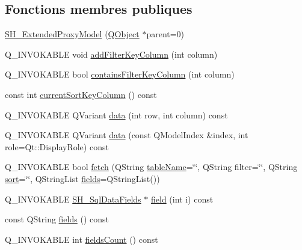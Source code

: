 \subsection*{Fonctions membres publiques}
\begin{DoxyCompactItemize}
\item 
\hyperlink{classSH__ExtendedProxyModel_a63b0969a9f5799c9e871e6ceb13cf83e}{S\-H\-\_\-\-Extended\-Proxy\-Model} (\hyperlink{classQObject}{Q\-Object} $\ast$parent=0)
\item 
Q\-\_\-\-I\-N\-V\-O\-K\-A\-B\-L\-E void \hyperlink{classSH__ExtendedProxyModel_a4e98e24b6b94adf31a2c5e935a48f831}{add\-Filter\-Key\-Column} (int column)
\item 
Q\-\_\-\-I\-N\-V\-O\-K\-A\-B\-L\-E bool \hyperlink{classSH__ExtendedProxyModel_a865da9bd795526dc63b8c6447d59cfc0}{contains\-Filter\-Key\-Column} (int column)
\item 
const int \hyperlink{classSH__ExtendedProxyModel_a76786ad4b81dbd521a610c2f6f973a96}{current\-Sort\-Key\-Column} () const 
\item 
Q\-\_\-\-I\-N\-V\-O\-K\-A\-B\-L\-E Q\-Variant \hyperlink{classSH__ExtendedProxyModel_aca6cc510f740e847e0cfc06e0adb5771}{data} (int row, int column) const 
\item 
Q\-\_\-\-I\-N\-V\-O\-K\-A\-B\-L\-E Q\-Variant \hyperlink{classSH__ExtendedProxyModel_afbc947efbe1107fc5bf8926c52902a1c}{data} (const Q\-Model\-Index \&index, int role=Qt\-::\-Display\-Role) const 
\item 
Q\-\_\-\-I\-N\-V\-O\-K\-A\-B\-L\-E bool \hyperlink{classSH__ExtendedProxyModel_a64f684a4a7d35925ff4f4b81984da60e}{fetch} (Q\-String \hyperlink{classSH__ExtendedProxyModel_aba6e6f8bbde17ea533de3e9a127c804a}{table\-Name}=\char`\"{}\char`\"{}, Q\-String filter=\char`\"{}\char`\"{}, Q\-String \hyperlink{classSH__ExtendedProxyModel_a5ed9b14df78667efe8b22d19617d6c4b}{sort}=\char`\"{}\char`\"{}, Q\-String\-List \hyperlink{classSH__ExtendedProxyModel_addbd48beef730fe7adfaffcaca8b256a}{fields}=Q\-String\-List())
\item 
Q\-\_\-\-I\-N\-V\-O\-K\-A\-B\-L\-E \hyperlink{classSH__SqlDataFields}{S\-H\-\_\-\-Sql\-Data\-Fields} $\ast$ \hyperlink{classSH__ExtendedProxyModel_ac73fae31c6ad69663b4df97f65ec945f}{field} (int i) const 
\item 
const Q\-String \hyperlink{classSH__ExtendedProxyModel_addbd48beef730fe7adfaffcaca8b256a}{fields} () const 
\item 
Q\-\_\-\-I\-N\-V\-O\-K\-A\-B\-L\-E int \hyperlink{classSH__ExtendedProxyModel_a5a5e6b84a9a397e096f4404cec5e9e0c}{fields\-Count} () const 

\end{DoxyCompactItemize}
